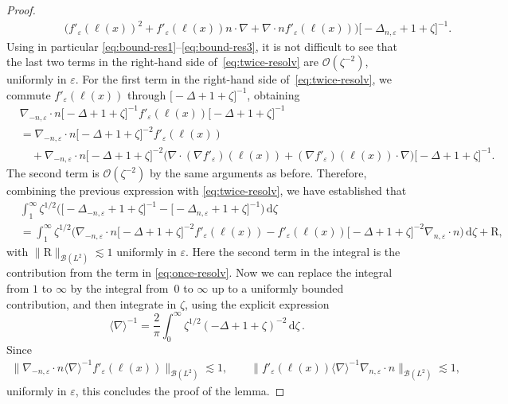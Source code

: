 \documentclass[12pt]{article}
\newcommand{\D}{\Delta}
\theoremstyle{plain}
\begin{document}
\begin{proof}
\begin{align}
    &\qquad\qquad\big(f'_\varepsilon(\ell(x))^2+f'_\varepsilon(\ell(x))n\cdot\nabla+\nabla\cdot n f'_\varepsilon(\ell(x))\big)\big[-\Delta_{ n,\varepsilon}+1+\zeta\big]^{-1}.\label{eq:twice-resolv}
\end{align}
Using in particular \eqref{eq:bound-res1}--\eqref{eq:bound-res3}, it is not difficult to see that the last two terms in the right-hand side of~\eqref{eq:twice-resolv} are $\mathcal{O}(\zeta^{-2})$, uniformly in $\varepsilon$. For the first term in the right-hand side of~\eqref{eq:twice-resolv}, we commute $f'_\varepsilon(\ell(x))$ through $\big[-\Delta+1+\zeta\big]^{-1}$, obtaining
\begin{align*}
    &\nabla_{- n,\varepsilon}\cdot n \big[-\Delta+1+\zeta\big]^{-1}f'_\varepsilon(\ell(x))\big[-\Delta+1+\zeta\big]^{-1}\\
    &=\nabla_{- n,\varepsilon}\cdot n \big[-\Delta+1+\zeta\big]^{-2}f'_\varepsilon(\ell(x))\\
    &\quad+\nabla_{- n,\varepsilon}\cdot n \big[-\Delta+1+\zeta\big]^{-2}\big(\nabla\cdot(\nabla f'_\varepsilon)(\ell(x))+(\nabla f'_\varepsilon)(\ell(x))\cdot\nabla\big)\big[-\Delta+1+\zeta\big]^{-1}.
\end{align*}
The second term is $\mathcal{O}(\zeta^{-2})$ by the same arguments as before. Therefore, combining the previous expression with \eqref{eq:twice-resolv}, we have  established that
\begin{align*}
    &\int_1^\infty \zeta^{1/2}\Big(\big[-\Delta_{- n,\varepsilon}+1+\zeta\big]^{-1}-\big[-\Delta_{ n,\varepsilon}+1+\zeta\big]^{-1}\Big)\, \mathrm{d}\zeta\\
    &=\int_1^\infty \zeta^{1/2}\Big( \nabla_{- n,\varepsilon}\cdot n \big[-\Delta+1+\zeta\big]^{-2}f'_\varepsilon(\ell(x))-  f'_\varepsilon(\ell(x))\big[-\Delta+1+\zeta\big]^{-2}\nabla_{ n,\varepsilon}\cdot n\Big)\, \mathrm{d}\zeta +\mathrm{R},
\end{align*}
with $\|\mathrm{R}\|_{\mathcal{B}(L^2)}\lesssim1$ uniformly in $\varepsilon$. Here the second term in the integral is the contribution from the term in \eqref{eq:once-resolv}. Now we can replace the integral from $1$ to $\infty$ by the integral from~$0$ to $\infty$ up to a uniformly bounded contribution, and then integrate in $\zeta$, using the explicit expression
\begin{equation*}
    \langle \nabla \rangle ^{-1} = \frac{2}{\pi} \int_0^\infty \zeta^{1/2} (-\D + 1+\zeta)^{-2}\, \mathrm{d}\zeta\,.
\end{equation*}
Since
 \begin{align*}
     \big\|\nabla_{- n,\varepsilon}\cdot n \langle\nabla\rangle^{-1} f'_\varepsilon(\ell(x))\big\|_{\mathcal{B}(L^2)}\lesssim1, \qquad \big\| f'_\varepsilon(\ell(x)) \langle\nabla\rangle^{-1}\nabla_{ n,\varepsilon}\cdot n\big\|_{\mathcal{B}(L^2)}\lesssim1,
 \end{align*}
 uniformly in $\varepsilon$, this concludes the proof of the lemma.
	\end{proof}
\end{document}
